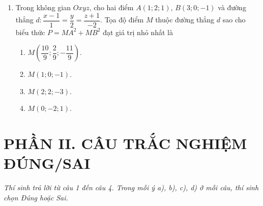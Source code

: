 \documentclass[12pt,a4paper]{article}
\begin{document}
\begin{enumerate}[label=\textbf{Câu \arabic*:}, leftmargin=*]
\item Trong không gian $Oxyz$, cho hai điểm $A(1; 2; 1)$, $B(3; 0; -1)$ và đường thẳng $d: \dfrac{x-1}{1} = \dfrac{y}{2} = \dfrac{z+1}{-2}$. Tọa độ điểm $M$ thuộc đường thẳng $d$ sao cho biểu thức $P = MA^2 + MB^2$ đạt giá trị nhỏ nhất là
\begin{enumerate}[label=\Alph*.]
    \item $M\left(\dfrac{10}{9}; \dfrac{2}{9}; -\dfrac{11}{9}\right)$.
    \item $M(1; 0; -1)$.
    \item $M(2; 2; -3)$.
    \item $M(0; -2; 1)$.
\end{enumerate}

\end{enumerate}

\section*{PHẦN II. CÂU TRẮC NGHIỆM ĐÚNG/SAI}
\textit{Thí sinh trả lời từ câu 1 đến câu 4. Trong mỗi ý a), b), c), d) ở mỗi câu, thí sinh chọn Đúng hoặc Sai.}
\end{document}
